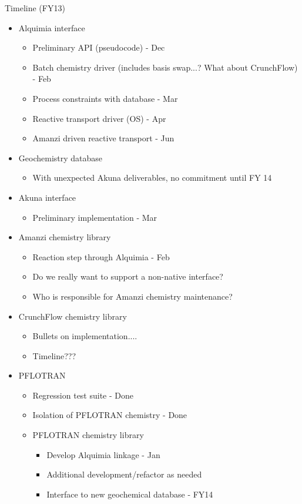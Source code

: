 \documentclass{beamer}
\newcommand{\pft}{PFLOTRAN\xspace}
\newcommand\gehcomment[1]{{{\color{orange} #1}}}
\begin{document}
\begin{frame}[allowframebreaks]{Timeline (FY13)}
\begin{itemize}
\item Alquimia interface
\begin{itemize}
\item Preliminary API (pseudocode) - Dec
\item Batch chemistry driver \gehcomment{(includes basis swap...? What about CrunchFlow)} - Feb
\item Process constraints with database - Mar
\item Reactive transport driver (OS) - Apr
\item Amanzi driven reactive transport - Jun
\end{itemize}
\item Geochemistry database
\begin{itemize}
\item With unexpected Akuna deliverables, no commitment until FY 14
\end{itemize}
\item Akuna interface
\begin{itemize}
\item Preliminary implementation - Mar
\end{itemize}

\newpage

\item Amanzi chemistry library
\begin{itemize}
\item Reaction step through Alquimia - Feb
\item \gehcomment{Do we really want to support a non-native interface?}
\item \gehcomment{Who is responsible for Amanzi chemistry maintenance?}
\end{itemize}
\item CrunchFlow chemistry library
\begin{itemize}
\item Bullets on implementation....
\item Timeline???
\end{itemize}
\item \pft
\begin{itemize}
\item Regression test suite - Done
\item Isolation of \pft chemistry - Done
\item \pft chemistry library
\begin{itemize}
\item Develop Alquimia linkage - Jan
\item Additional development/refactor as needed
\item Interface to new geochemical database - FY14
\end{itemize}
\end{itemize}
\end{itemize}
\end{frame}
\end{document}
